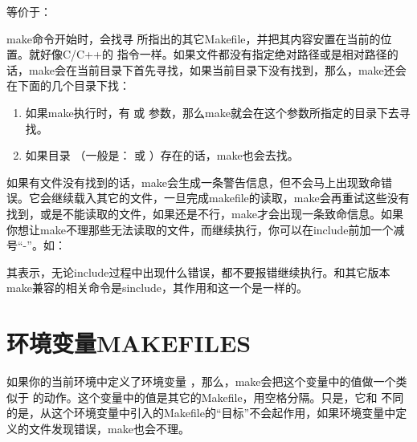 \documentclass[a4paper,10pt]{sphinxmanual}
\begin{document}
\begin{sphinxVerbatim}[commandchars=\\\{\}]
\end{sphinxVerbatim}

等价于：

\begin{sphinxVerbatim}[commandchars=\\\{\}]
\end{sphinxVerbatim}

make命令开始时，会找寻  所指出的其它Makefile，并把其内容安置在当前的位置。就好像C/C++的  指令一样。如果文件都没有指定绝对路径或是相对路径的话，make会在当前目录下首先寻找，如果当前目录下没有找到，那么，make还会在下面的几个目录下找：
\begin{enumerate}
\def\theenumi{\arabic{enumi}}
\def\labelenumi{\theenumi .}
\makeatletter\def\p@enumii{\p@enumi \theenumi .}\makeatother
\item {} 
如果make执行时，有  或  参数，那么make就会在这个参数所指定的目录下去寻找。

\item {} 
如果目录  （一般是：  或
 ）存在的话，make也会去找。

\end{enumerate}

如果有文件没有找到的话，make会生成一条警告信息，但不会马上出现致命错误。它会继续载入其它的文件，一旦完成makefile的读取，make会再重试这些没有找到，或是不能读取的文件，如果还是不行，make才会出现一条致命信息。如果你想让make不理那些无法读取的文件，而继续执行，你可以在include前加一个减号“-”。如：

\begin{sphinxVerbatim}[commandchars=\\\{\}]
\end{sphinxVerbatim}

其表示，无论include过程中出现什么错误，都不要报错继续执行。和其它版本make兼容的相关命令是sinclude，其作用和这一个是一样的。


\section{环境变量MAKEFILES}
\label{\detokenize{introduction:id9}}
如果你的当前环境中定义了环境变量  ，那么，make会把这个变量中的值做一个类似于
 的动作。这个变量中的值是其它的Makefile，用空格分隔。只是，它和  不同的是，从这个环境变量中引入的Makefile的“目标”不会起作用，如果环境变量中定义的文件发现错误，make也会不理。
\end{document}
